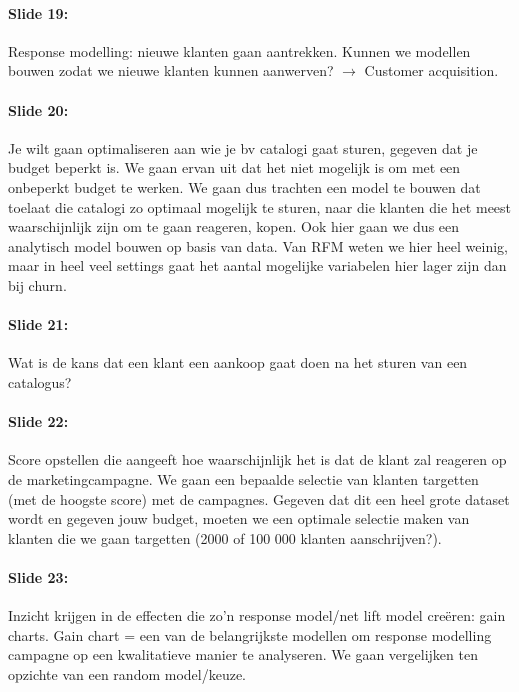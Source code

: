\documentclass[10pt,a4paper]{report}
\begin{document}
\paragraph{Slide 19:}Response modelling: nieuwe klanten gaan aantrekken. Kunnen we modellen bouwen zodat we nieuwe klanten kunnen aanwerven? $\rightarrow$ Customer acquisition.

\paragraph{Slide 20:}Je wilt gaan optimaliseren aan wie je bv catalogi gaat sturen, gegeven dat je budget beperkt is. We gaan ervan uit dat het niet mogelijk is om met een onbeperkt budget te werken. We gaan dus trachten een model te bouwen dat toelaat die catalogi zo optimaal mogelijk te sturen, naar die klanten die het meest waarschijnlijk zijn om te gaan reageren, kopen. Ook hier gaan we dus een analytisch model bouwen op basis van data.
Van RFM weten we hier heel weinig, maar in heel veel settings gaat het aantal mogelijke variabelen hier lager zijn dan bij churn.

\paragraph{Slide 21:}Wat is de kans dat een klant een aankoop gaat doen na het sturen van een catalogus?

\paragraph{Slide 22:}Score opstellen die aangeeft hoe waarschijnlijk het is dat de klant zal reageren op de marketingcampagne. We gaan een bepaalde selectie van klanten targetten (met de hoogste score) met de campagnes.
Gegeven dat dit een heel grote dataset wordt en gegeven jouw budget, moeten we een optimale selectie maken van klanten die we gaan targetten (2000 of 100 000 klanten aanschrijven?).

\paragraph{Slide 23:}Inzicht krijgen in de effecten die zo'n response model/net lift model creëren: gain charts. Gain chart = een van de belangrijkste modellen om response modelling campagne op een kwalitatieve manier te analyseren. We gaan vergelijken ten opzichte van een random model/keuze.
\end{document}
